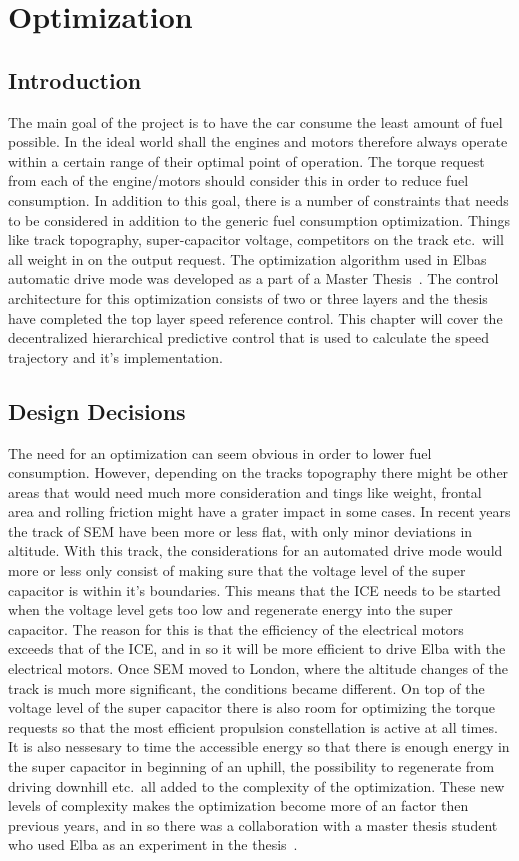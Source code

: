 \chapter{Optimization}

\section{Introduction}
The main goal of the project is to have the car consume the least amount of fuel
possible.  In the ideal world shall the engines and motors therefore always
operate within a certain range of their optimal point of operation. The torque
request from each of the engine/motors should consider this in order to reduce
fuel consumption. In addition to this goal, there is a number of constraints
that needs to be considered in addition to the generic fuel consumption
optimization.  Things like track topography, super-capacitor voltage,
competitors on the track etc.\ will all weight in on the output request. The
optimization algorithm used in Elbas automatic drive mode was developed as a
part of a Master Thesis~\cite{liu2016}. The control architecture for this
optimization consists of two or three layers and the thesis have completed the
top layer speed reference control. This chapter will cover the decentralized
hierarchical predictive control that is used to calculate the speed trajectory
and it's implementation.

\section{Design Decisions}
The need for an optimization can seem obvious in order to lower fuel
consumption. However, depending on the tracks topography there might be other
areas that would need much more consideration and tings like weight, frontal
area and rolling friction might have a grater impact in some cases. In recent
years the track of SEM have been more or less flat, with only minor deviations
in altitude. With this track, the considerations for an automated drive mode
would more or less only consist of making sure that the voltage level of the
super capacitor is within it's boundaries. This means that the ICE needs to be
started when the voltage level gets too low and regenerate energy into the super
capacitor. The reason for this is that the efficiency of the electrical motors
exceeds that of the ICE, and in so it will be more efficient to drive Elba with
the electrical motors.  Once SEM moved to London, where the altitude changes of
the track is much more significant, the conditions became different. On top of
the voltage level of the super capacitor there is also room for optimizing the
torque requests so that the most efficient propulsion constellation is active at
all times. It is also nessesary to time the accessible energy so that there is
enough energy in the super capacitor in beginning of an uphill, the possibility
to regenerate from driving downhill etc.\ all added to the complexity of the
optimization.  These new levels of complexity makes the optimization become more
of an factor then previous years, and in so there was a collaboration with a
master thesis student who used Elba as an experiment in the
thesis~\cite{liu2016}.

